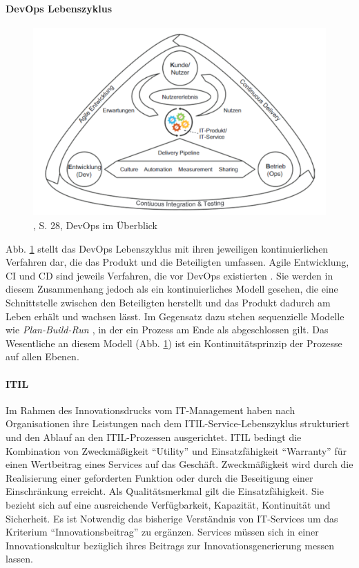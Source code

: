 \paragraph{DevOps Lebenszyklus}
\begin{figure}[htbp]
 \centering
 \includegraphics[width=1.0\textwidth]{gfx/devops_ueberblick.PNG}
 \caption{\citet{Alt2017}, S. 28, DevOps im Überblick\label{fig:devops}}
\end{figure}
\medskip
Abb. \ref{fig:devops} stellt das DevOps Lebenszyklus mit ihren jeweiligen kontinuierlichen Verfahren dar, die das Produkt und die Beteiligten umfassen. Agile Entwicklung, \ac{CI} und \ac{CD} sind jeweils Verfahren, die vor DevOps existierten \cite{Alt2017}. Sie werden in diesem Zusammenhang jedoch als ein kontinuierliches Modell gesehen, die eine Schnittstelle zwischen den Beteiligten herstellt und das Produkt dadurch am Leben erhält und wachsen lässt. Im Gegensatz dazu stehen sequenzielle Modelle wie \emph{Plan-Build-Run \cite{Koch2016}}, in der ein Prozess am Ende als abgeschlossen gilt. Das Wesentliche an diesem Modell (Abb. \ref{fig:devops}) ist ein Kontinuitätsprinzip \cite{Alt2017} der Prozesse auf allen Ebenen.

\paragraph{ITIL}
\label{def:itil}
Im Rahmen des Innovationsdrucks vom IT-Management haben nach \citet{Alt2017} Organisationen ihre Leistungen nach dem ITIL-Service-Lebenszyklus strukturiert und den Ablauf an den ITIL-Prozessen ausgerichtet. ITIL bedingt die Kombination von Zweckmäßigkeit \enquote{Utility} und Einsatzfähigkeit \enquote{Warranty} für einen Wertbeitrag eines Services auf das Geschäft. Zweckmäßigkeit wird durch die Realisierung einer geforderten Funktion oder durch die Beseitigung einer Einschränkung erreicht. Als Qualitätsmerkmal gilt die Einsatzfähigkeit. Sie bezieht sich auf eine ausreichende Verfügbarkeit, Kapazität, Kontinuität und Sicherheit. Es ist Notwendig das bisherige Verständnis von IT-Services um das Kriterium \enquote{Innovationsbeitrag} zu ergänzen. Services müssen sich in einer Innovationskultur bezüglich ihres Beitrags zur Innovationsgenerierung messen lassen.

